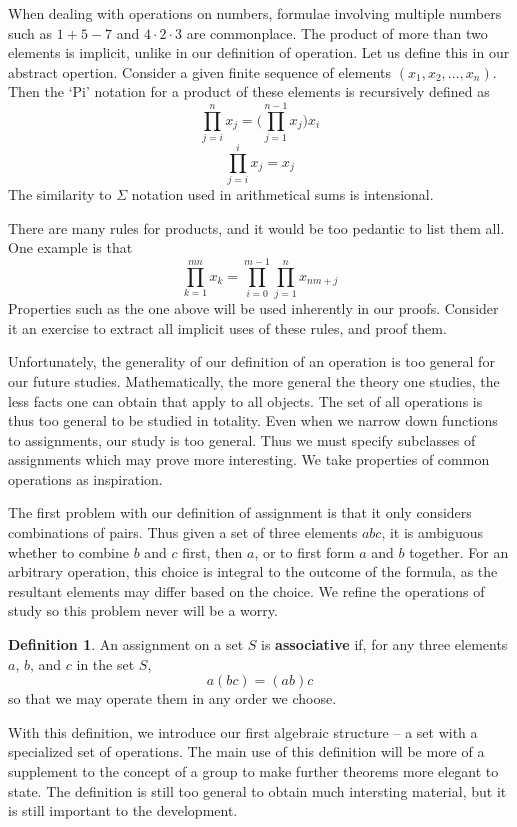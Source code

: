 \documentclass[12pt]{amsbook}
\theoremstyle{definition}
\newtheorem{definition}{Definition}
\begin{document}
When dealing with operations on numbers, formulae involving multiple numbers such as $1 + 5 - 7$ and $4 \cdotp 2 \cdotp 3$ are commonplace. The product of more than two elements is implicit, unlike in our definition of operation. Let us define this in our abstract opertion. Consider a given finite sequence of elements $(x_1,x_2, \dots, x_n)$. Then the `Pi' notation for a product of these elements is recursively defined as
%
\[ \prod_{j = i}^n x_j = \big( \prod_{j = 1}^{n-1} x_j \big) x_i \]
\[ \prod_{j = i}^i x_j = x_j \]
%
The similarity to $\Sigma$ notation used in arithmetical sums is intensional.

There are many rules for products, and it would be too pedantic to list them all. One example is that
%
\[ \prod_{k = 1}^{mn} x_k = \prod_{i = 0}^{m-1} \prod_{j = 1}^n x_{nm + j} \]
%
Properties such as the one above will be used inherently in our proofs. Consider it an exercise to extract all implicit uses of these rules, and proof them.

Unfortunately, the generality of our definition of an operation is too general for our future studies. Mathematically, the more general the theory one studies, the less facts one can obtain that apply to all objects. The set of all operations is thus too general to be studied in totality. Even when we narrow down functions to assignments, our study is too general. Thus we must specify subclasses of assignments which may prove more interesting. We take properties of common operations as inspiration.

The first problem with our definition of assignment is that it only considers combinations of pairs. Thus given a set of three elements $abc$, it is ambiguous whether to combine $b$ and $c$ first, then $a$, or to first form $a$ and $b$ together. For an arbitrary operation, this choice is integral to the outcome of the formula, as the resultant elements may differ based on the choice. We refine the operations of study so this problem never will be a worry.

\begin{definition}
    An assignment on a set $S$ is {\bf associative} if, for any three elements $a$, $b$, and $c$ in the set $S$,
    \[ a(bc) = (ab)c \]
    so that we may operate them in any order we choose.
\end{definition}

With this definition, we introduce our first algebraic structure -- a set with a specialized set of operations. The main use of this definition will be more of a supplement to the concept of a group to make further theorems more elegant to state. The definition is still too general to obtain much intersting material, but it is still important to the development.
\end{document}
